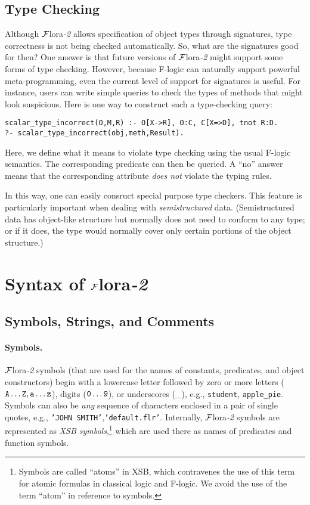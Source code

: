 \documentclass[11pt]{article}
\newcommand{\FLORA}{{\mbox{${\cal F}${\sc lora}\rm\emph{-2}}}\xspace}
\newcommand{\fl}{\mbox{F-logic}\xspace}
\begin{document}
\subsection{Type Checking}


Although \FLORA allows specification of object types through signatures,
type correctness is not being checked automatically. So, what are the
signatures good for then? One answer is that future versions of \FLORA
might support some forms of type checking. However, because \fl can
naturally support powerful meta-programming, even the current level
of support for signatures is useful. For instance, users can write
simple queries to check the types of methods that might look suspicious.
Here is one way to construct such a type-checking query:
\begin{verbatim}
scalar_type_incorrect(O,M,R) :- O[X->R], O:C, C[X=>D], tnot R:D.
?- scalar_type_incorrect(obj,meth,Result).
\end{verbatim}
Here, we define what it means to violate type checking using the usual
\fl semantics. The corresponding predicate can then be queried. A
``{\sf no}'' answer means that the corresponding attribute \emph{does not}
violate the typing rules.

In this way, one can easily consruct special purpose type checkers.  This
feature is particularly important when dealing with \emph{semistructured}
data. (Semistructured data has object-like structure but normally does not
need to conform to any type; or if it does, the type would normally cover
only certain portions of the object structure.)


\section{Syntax of \FLORA}


\subsection{Symbols, Strings, and Comments}


\paragraph{Symbols.}
\FLORA symbols (that are used for the names of constants, predicates, and
object constructors) begin with a lowercase letter followed by zero or more
letters ($\tt A \ldots Z, a \ldots z$), digits ($\tt 0 \ldots 9$), or underscores
(\_), e.g., \texttt{student}, \texttt{apple\_pie}. Symbols can also be
\emph{any} sequence of characters enclosed in a pair of single quotes,
e.g., \texttt{'JOHN SMITH'},\texttt{'default.flr'}.  Internally, \FLORA
symbols are represented as \emph{XSB symbols},\footnote{
  Symbols are called ``atoms'' in XSB, which contravenes the use of this
  term for atomic formulas in classical logic and \fl.
  We avoid the use of the term ``atom'' in reference to symbols.
  }
which are used there as names of predicates and function symbols.
\end{document}
